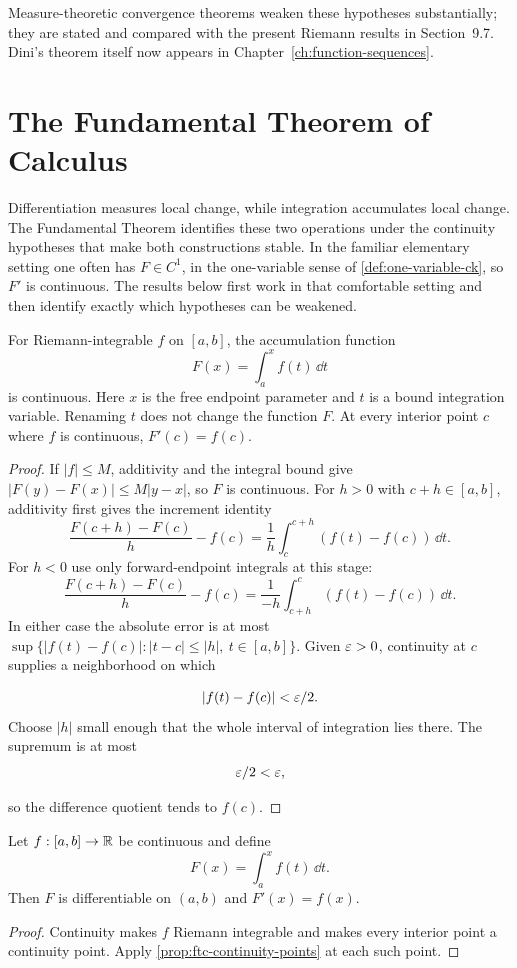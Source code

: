 Measure-theoretic convergence theorems weaken these hypotheses
substantially; they are stated and compared with the present Riemann results
in Section~9.7. Dini's theorem itself now appears in
Chapter~\ref{ch:function-sequences}.

\section{The Fundamental Theorem of Calculus}

Differentiation measures local change, while integration accumulates local
change.  The Fundamental Theorem identifies these two operations under the
continuity hypotheses that make both constructions stable. In the familiar
elementary setting one often has \(F\in C^1\), in the one-variable sense of
\cref{def:one-variable-ck}, so \(F'\) is continuous. The results below first
work in that comfortable setting and then identify exactly which hypotheses
can be weakened.

\begin{proposition}
\label{prop:ftc-continuity-points}
For Riemann-integrable $f$ on $[a,b]$, the accumulation function
\[
F(x)=\int_a^x f(t)\,\dd t
\]
is continuous. Here $x$ is the free
endpoint parameter and $t$ is a bound integration variable. Renaming $t$
does not change the function $F$.
At every interior point $c$ where $f$ is continuous, $F'(c)=f(c)$.
\end{proposition}
\begin{proof}
If $|f|\leq M$, additivity and the integral bound give
$|F(y)-F(x)|\leq M|y-x|$, so $F$ is continuous.
For $h>0$ with $c+h\in[a,b]$, additivity first gives the increment identity
\[
\frac{F(c+h)-F(c)}h-f(c)=\frac1h\int_c^{c+h}(f(t)-f(c))\,\dd t.
\]
For $h<0$ use only forward-endpoint integrals at this stage:
\[
\frac{F(c+h)-F(c)}h-f(c)
=\frac1{-h}\int_{c+h}^{c}(f(t)-f(c))\,\dd t.
\]
In either case the absolute error is at most
$\sup\{|f(t)-f(c)|:|t-c|\leq|h|,\ t\in[a,b]\}$.
Given $\varepsilon>0$, continuity at $c$ supplies a neighborhood on which

\[
|f(t)-f(c)|<\varepsilon/2.
\]
 Choose $|h|$ small enough that the whole interval
of integration lies there. The supremum is at most
\[
\varepsilon/2<\varepsilon,
\]

so the difference quotient tends to $f(c)$.
\end{proof}

\begin{corollary}
\label{thm:ftc-one}
Let $f:[a,b]\to\mathbb{R}$ be continuous and define
\[
F(x)=\int_a^x f(t)\,\dd t.
\]
Then $F$ is differentiable on $(a,b)$ and $F'(x)=f(x)$.
\end{corollary}
\begin{proof}
Continuity makes $f$ Riemann integrable and makes every interior point a
continuity point. Apply \cref{prop:ftc-continuity-points} at each such point.
\end{proof}

